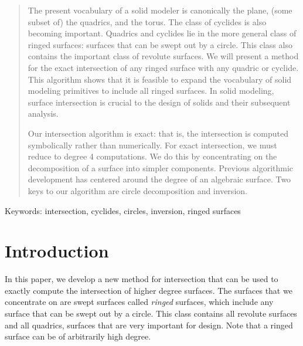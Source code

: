 \begin{abstract}
The present vocabulary of a solid modeler is canonically the plane,
(some subset of) the quadrics, and the torus.
The class of cyclides is also becoming important.
Quadrics and cyclides lie in the more general class of ringed surfaces:
surfaces that can be swept out by a circle.
This class also contains the important class of revolute surfaces.
We will present a method for the exact intersection of any ringed surface with
any quadric or cyclide.
This algorithm shows that it is feasible to expand the 
vocabulary of solid modeling primitives to include all ringed surfaces.
In solid modeling, surface intersection is crucial to the design of solids
and their subsequent analysis.

Our intersection algorithm is exact: 
that is, the intersection is computed symbolically rather than numerically.
For exact intersection, we must reduce to degree 4 computations.
We do this by concentrating on the decomposition of a surface into simpler
components.
Previous algorithmic development has centered around 
the degree of an algebraic surface.
Two keys to our algorithm are circle decomposition and inversion.
\end{abstract}


Keywords: intersection, cyclides, circles, inversion, ringed surfaces


\section{Introduction}

In this paper, we develop a new method for intersection that can be used
to exactly compute the intersection of higher degree surfaces.
The surfaces that we concentrate on are swept surfaces called {\em ringed}
surfaces, which include any surface that can be swept out by a circle.
This class contains all revolute surfaces and all quadrics, surfaces that
are very important for design.
Note that a ringed surface can be of arbitrarily high degree.

